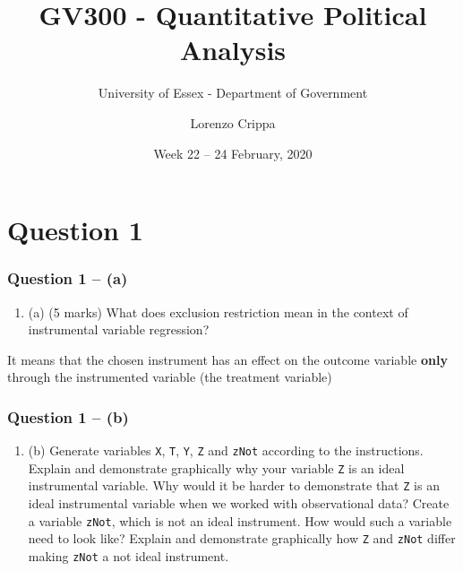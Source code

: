 \documentclass[xcolor=table,dvipsnames]{beamer}
\title{GV300 - Quantitative Political Analysis}
\subtitle{University of Essex - Department of Government}
\date{Week 22 -- 24 February, 2020}				%
\author{Lorenzo Crippa}
\begin{document}
\begin{frame}[plain]
\begin{center}
\titlepage
\end{center}
\end{frame}

\section{Question 1}

\begin{frame}
\frametitle{Question 1 -- (a)}
\begin{enumerate}
\item (a) (5 marks) What does exclusion restriction mean in the context of instrumental variable regression? \pause
\end{enumerate}

It means that the chosen instrument has an effect on the outcome variable \textbf{only} through the instrumented variable (the treatment variable)
\end{frame}

\begin{frame}
\frametitle{Question 1 -- (b)}
\begin{enumerate}
\item (b) Generate variables \texttt{X}, \texttt{T}, \texttt{Y}, \texttt{Z} and \texttt{zNot} according to the instructions. \pause Explain and demonstrate
graphically why your variable \texttt{Z} is an ideal instrumental variable. \pause Why would it be harder to demonstrate that \texttt{Z} is an ideal instrumental variable when we worked with observational data? \pause Create a variable \texttt{zNot}, which is not an ideal instrument. How would such a variable need to look like? \pause Explain and demonstrate graphically how \texttt{Z} and \texttt{zNot} differ making \texttt{zNot} a not ideal instrument.
\end{enumerate}
\end{frame}
\end{document}
